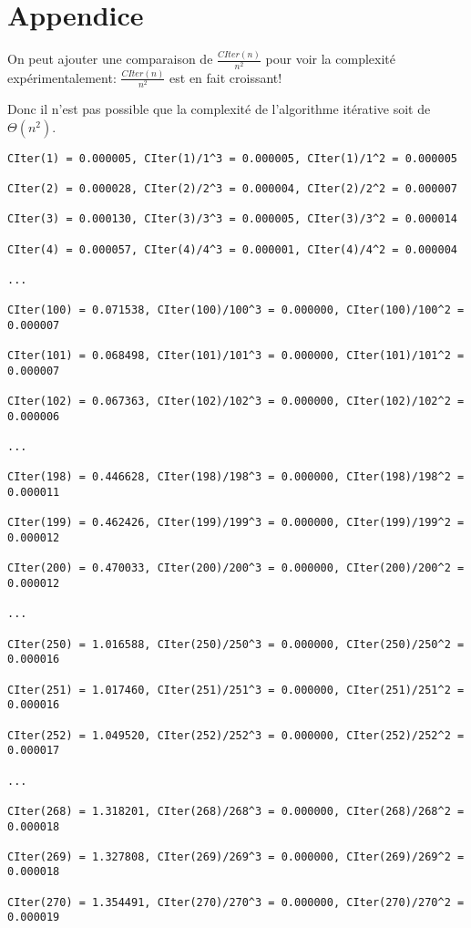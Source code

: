 \documentclass[french]{article}
\begin{document}
\section*{Appendice}
On peut ajouter une comparaison de $\frac{CIter(n)}{n^2}$ pour voir la complexité expérimentalement: $\frac{CIter(n)}{n^2}$ est en fait croissant!\par Donc il n'est pas possible que la complexité de l'algorithme itérative soit de $\Theta(n^2)$.
\begin{lstlisting}
CIter(1) = 0.000005, CIter(1)/1^3 = 0.000005, CIter(1)/1^2 = 0.000005

CIter(2) = 0.000028, CIter(2)/2^3 = 0.000004, CIter(2)/2^2 = 0.000007

CIter(3) = 0.000130, CIter(3)/3^3 = 0.000005, CIter(3)/3^2 = 0.000014

CIter(4) = 0.000057, CIter(4)/4^3 = 0.000001, CIter(4)/4^2 = 0.000004

...

CIter(100) = 0.071538, CIter(100)/100^3 = 0.000000, CIter(100)/100^2 = 0.000007

CIter(101) = 0.068498, CIter(101)/101^3 = 0.000000, CIter(101)/101^2 = 0.000007

CIter(102) = 0.067363, CIter(102)/102^3 = 0.000000, CIter(102)/102^2 = 0.000006

...

CIter(198) = 0.446628, CIter(198)/198^3 = 0.000000, CIter(198)/198^2 = 0.000011

CIter(199) = 0.462426, CIter(199)/199^3 = 0.000000, CIter(199)/199^2 = 0.000012

CIter(200) = 0.470033, CIter(200)/200^3 = 0.000000, CIter(200)/200^2 = 0.000012

...

CIter(250) = 1.016588, CIter(250)/250^3 = 0.000000, CIter(250)/250^2 = 0.000016

CIter(251) = 1.017460, CIter(251)/251^3 = 0.000000, CIter(251)/251^2 = 0.000016

CIter(252) = 1.049520, CIter(252)/252^3 = 0.000000, CIter(252)/252^2 = 0.000017

...

CIter(268) = 1.318201, CIter(268)/268^3 = 0.000000, CIter(268)/268^2 = 0.000018

CIter(269) = 1.327808, CIter(269)/269^3 = 0.000000, CIter(269)/269^2 = 0.000018

CIter(270) = 1.354491, CIter(270)/270^3 = 0.000000, CIter(270)/270^2 = 0.000019


\end{lstlisting}
\end{document}
